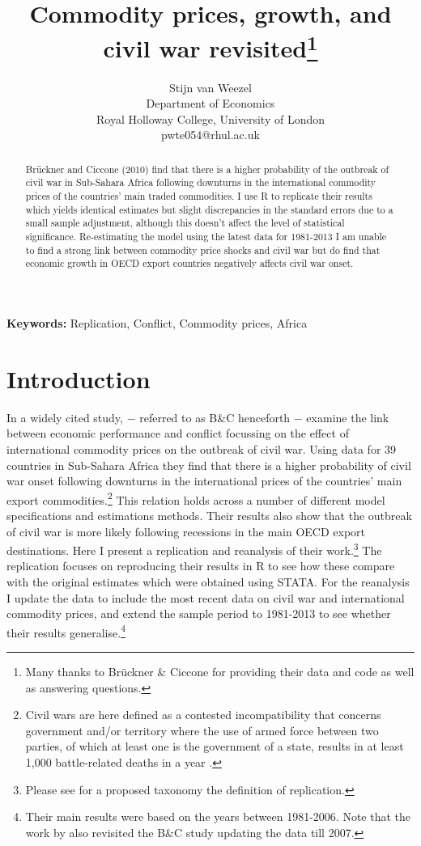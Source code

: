 \documentclass[a4paper,11pt]{article}
\title{Commodity prices, growth, and civil war revisited\thanks{Many thanks to Brückner \& Ciccone for providing their data and code as well as answering questions.}}
\author{Stijn van Weezel \\
          Department of Economics\\
          Royal Holloway College, University of London \\
          pwte054@rhul.ac.uk}
\date{}
\makeatletter
\def\maketitle{{%
  \renewenvironment{tabular}[2][]
    {\begin{flushleft}}
    {\end{flushleft}}
  \AB@maketitle}}
\makeatother
\begin{document}
\maketitle
\noindent
\begin{abstract}
\noindent
Brückner and Ciccone (2010) find that there is a higher probability of the outbreak of civil war in Sub-Sahara Africa following downturns in the international commodity prices of the countries' main traded commodities. 
I use R to replicate their results which yields identical estimates but slight discrepancies in the standard errors due to a small sample adjustment, although this doesn't affect the level of statistical significance.
Re-estimating the model using the latest data for 1981-2013 I am unable to find a strong link between commodity price shocks and civil war but do find that economic growth in OECD export countries negatively affects civil war onset. 
\end{abstract}
\textbf{Keywords:} Replication, Conflict, Commodity prices, Africa
\section{Introduction}
In a widely cited study, \citet{Bruckner2010} $-$ referred to as B\&C henceforth $-$ examine the link between economic performance and conflict focussing on the effect of international commodity prices on the outbreak of civil war. 
Using data for 39 countries in Sub-Sahara Africa they find that there is a higher probability of civil war onset following downturns in the international prices of the countries' main export commodities.\footnote{Civil wars are here defined as a contested incompatibility that concerns government and/or
territory where the use of armed force between two parties, of which at least one is the
government of a state, results in at least 1,000 battle-related deaths in a year \citep{Gleditsch2002}.} 
This relation holds across a number of different model specifications and estimations methods. 
Their results also show that the outbreak of civil war is more likely following recessions in the main OECD export destinations.
Here I present a replication and reanalysis of their work.\footnote{Please see \citet{Clemens2015} for a proposed taxonomy the definition of replication.} 
The replication focuses on reproducing their results in R to see how these compare with the original estimates which were obtained using STATA. 
For the reanalysis I update the data to include the most recent data on civil war and international commodity prices, and extend the sample period to 1981-2013 to see whether their results generalise.\footnote{Their main results were based on the years between 1981-2006. Note that the work by \citet{Bazzi2014} also revisited the B\&C study updating the data till 2007.} 
\end{document}
